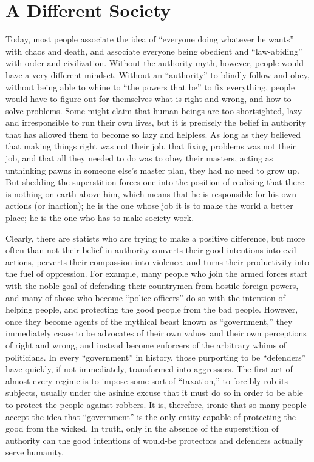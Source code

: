 \documentclass{book}
\begin{document}
\section{A Different Society}

Today, most people associate the idea of \enquote{everyone doing whatever he wants} with chaos and death, and associate everyone being obedient and \enquote{law-abiding} with order and civilization. Without the authority myth, however, people would have a very different mindset. Without an \enquote{authority} to blindly follow and obey, without being able to whine to \enquote{the powers that be} to fix everything, people would have to figure out for themselves what is right and wrong, and how to solve problems. Some might claim that human beings are too shortsighted, lazy and irresponsible to run their own lives, but it is precisely the belief in authority that has allowed them to become so lazy and helpless. As long as they believed that making things right was not their job, that fixing problems was not their job, and that all they needed to do was to obey their masters, acting as unthinking pawns in someone else's master plan, they had no need to grow up. But shedding the superstition forces one into the position of realizing that there is nothing on earth above him, which means that he is responsible for his own actions (or inaction); he is the one whose job it is to make the world a better place; he is the one who has to make society work.

Clearly, there are statists who are trying to make a positive difference, but more often than not their belief in authority converts their good intentions into evil actions, perverts their compassion into violence, and turns their productivity into the fuel of oppression. For example, many people who join the armed forces start with the noble goal of defending their countrymen from hostile foreign powers, and many of those who become \enquote{police officers} do so with the intention of helping people, and protecting the good people from the bad people. However, once they become agents of the mythical beast known as \enquote{government,} they immediately cease to be advocates of their own values and their own perceptions of right and wrong, and instead become enforcers of the arbitrary whims of politicians. In every \enquote{government} in history, those purporting to be \enquote{defenders} have quickly, if not immediately, transformed into aggressors. The first act of almost every regime is to impose some sort of \enquote{taxation,} to forcibly rob its subjects, usually under the asinine excuse that it must do so in order to be able to protect the people against robbers. It is, therefore, ironic that so many people accept the idea that \enquote{government} is the only entity capable of protecting the good from the wicked. In truth, only in the absence of the superstition of authority can the good intentions of would-be protectors and defenders actually serve humanity.
\end{document}
